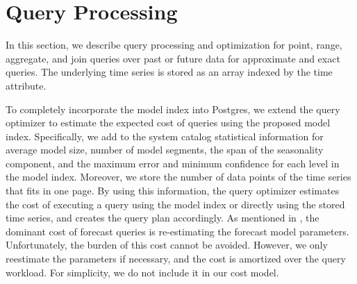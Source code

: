 \documentclass{sigmod}
\begin{document}

\section{Query Processing}%
\label{sec:online}
In this section, we describe query processing and optimization for point, range, aggregate, and join queries over past or future data for approximate and exact queries.
The underlying time series is stored as an array indexed by the time attribute.

To completely incorporate the model index into Postgres, we extend the query optimizer to estimate the expected cost of queries using the proposed model index.  Specifically, we add to the system catalog statistical information for average model size, number of model segments, the span of the seasonality component, 
and the maximum error and minimum confidence for each level in the model index. Moreover, we store  the number of data points of the time series that fits in one page.
By using this information, the query optimizer estimates the cost of executing a query using the model index or directly using the stored time series,
and creates the query plan accordingly.
As mentioned in \cite{ArimaDB}, the dominant cost of forecast queries is re-estimating the forecast model parameters. Unfortunately, the burden of this cost cannot be avoided. 
However, we only reestimate the parameters if necessary\cite{FRL12}, and the cost is amortized over the query workload. For simplicity, we do not include it in our cost model.
\end{document}
